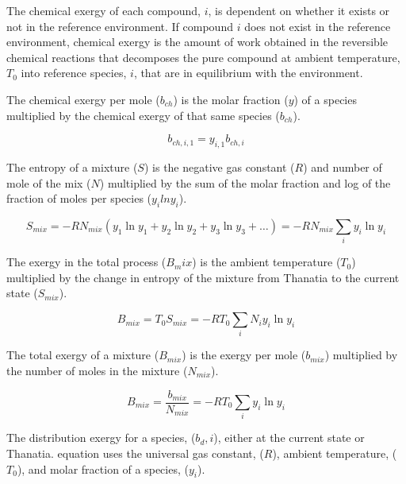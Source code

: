 \documentclass[energies,article,submit,pdftex,moreauthors]{Definitions/mdpi}
\begin{document}
The chemical exergy of each compound, $i$, is dependent
on whether it exists or not
in the reference environment.
If compound $i$ does not exist
in the reference environment,
chemical exergy is the amount of work obtained
in the reversible chemical reactions
that decomposes the pure compound at ambient temperature, $T_{0}$
into reference species, $i$, that are in equilibrium
with the environment.

The chemical exergy per mole ($b_{ch}$) is the molar fraction ($y$)
of a species multiplied by the chemical exergy of that same species ($b_{ch}$).

\begin{equation}\label{eq:chemical_exergy_state_point1}
  b_{ch,i,1} = y_{i,1}b_{ch,i}
\end{equation}

The entropy of a mixture ($S$) is the negative gas constant ($R$)
and number of mole of the mix ($N$)
multiplied by the sum of the molar fraction
and log of the fraction of moles per species ($y_i$$lny_i$).

\begin{equation}\label{eq:specific_entropy_of_mixture_definition}
  S_{mix} = -RN_{mix}(y_{1}\ln{y_{1}} + y_{2}\ln{y_{2}} + y_{3}\ln{y_{3}} + \ldots)
          = -RN_{mix}\sum_{i} y_{i}\ln{y_{i}}
\end{equation}

The exergy in the total process ($B_mix$) is the ambient temperature ($T_{0}$) multiplied by the change
in entropy of the mixture from Thanatia to the current state ($S_{mix}$).

\begin{equation}\label{eq:specific_exergy_of_mixture_definition1}
  B_{mix} = T_{0}S_{mix} = -RT_{0}\sum_{i}{N_{i}{y_{i}}\ln{y_{i}}}
\end{equation}

The total exergy of a mixture ($B_{mix}$) is the exergy per mole ($b_{mix}$) multiplied by the number of moles
in the mixture ($N_{mix}$).

\begin{equation}\label{eq:specific_exergy_of_mixture_definition2}
  B_{mix} = \frac{b_{mix}}{N_{mix}} = -RT_{0}\sum_{i}y_{i}\ln{y_{i}}
\end{equation}

The distribution exergy for a species, ($b_d,i$),
either at the current state or Thanatia.
equation uses the universal gas constant, ($R$), ambient temperature, ($T_0$),
and molar fraction of a species, ($y_i$).
\end{document}
